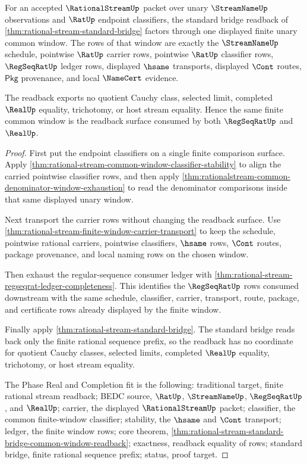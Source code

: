 \begin{theorem}\label{thm:rational-stream-standard-bridge-common-window-readback}
For an accepted $\RationalStreamUp$ packet over unary $\StreamNameUp$
observations and $\RatUp$ endpoint classifiers, the standard bridge readback
of \autoref{thm:rational-stream-standard-bridge} factors through one displayed
finite unary common window. The rows of that window are exactly the
$\StreamNameUp$ schedule, pointwise $\RatUp$ carrier rows, pointwise $\RatUp$
classifier rows, $\RegSeqRatUp$ ledger rows, displayed $\hsame$ transports,
displayed $\Cont$ routes, $\mathsf{Pkg}$ provenance, and local $\NameCert$
evidence.

The readback exports no quotient Cauchy class, selected limit, completed
$\RealUp$ equality, trichotomy, or host stream equality. Hence the same finite
common window is the readback surface consumed by both $\RegSeqRatUp$ and
$\RealUp$.
\end{theorem}
\begin{proof}
First put the endpoint classifiers on a single finite comparison surface.
Apply \autoref{thm:rational-stream-common-window-classifier-stability} to align
the carried pointwise classifier rows, and then apply
\autoref{thm:rationalstream-common-denominator-window-exhaustion} to read the
denominator comparisons inside that same displayed unary window.

Next transport the carrier rows without changing the readback surface. Use
\autoref{thm:rational-stream-finite-window-carrier-transport} to keep the
schedule, pointwise rational carriers, pointwise classifiers, $\hsame$ rows,
$\Cont$ routes, package provenance, and local naming rows on the chosen window.

Then exhaust the regular-sequence consumer ledger with
\autoref{thm:rational-stream-regseqrat-ledger-completeness}. This identifies
the $\RegSeqRatUp$ rows consumed downstream with the same schedule,
classifier, carrier, transport, route, package, and certificate rows already
displayed by the finite window.

Finally apply \autoref{thm:rational-stream-standard-bridge}. The standard
bridge reads back only the finite rational sequence prefix, so the readback
has no coordinate for quotient Cauchy classes, selected limits, completed
$\RealUp$ equality, trichotomy, or host stream equality.

The Phase Real and Completion fit is the following: traditional target,
finite rational stream readback; BEDC source, $\RatUp$, $\StreamNameUp$,
$\RegSeqRatUp$, and $\RealUp$; carrier, the displayed $\RationalStreamUp$
packet; classifier, the common finite-window classifier; stability, the
$\hsame$ and $\Cont$ transport; ledger, the finite window rows; core theorem,
\autoref{thm:rational-stream-standard-bridge-common-window-readback};
exactness, readback equality of rows; standard bridge, finite rational
sequence prefix; status, proof target.
\end{proof}

